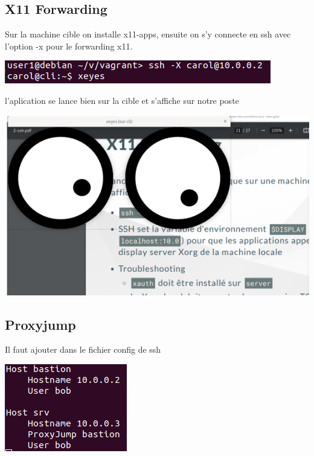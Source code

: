 \documentclass{article}
\begin{document}
 \subsection{\large{X11 Forwarding}}
 
 Sur la machine cible on installe x11-apps, ensuite on s'y connecte en ssh avec l'option -x pour le forwarding x11.
 
  \begin{center}
        \includegraphics[scale=0.5]{Images/x11.png}
 \end{center}
 
 l'aplication se lance bien sur la cible et s'affiche sur notre poste
 
  \begin{center}
        \includegraphics[scale=0.5]{Images/x11result.png}
 \end{center}
 
  
  
  \subsection{\large{Proxyjump}}
  
  Il faut ajouter dans le fichier config de ssh
  
  \begin{center}
        \includegraphics[scale=0.5]{Images/proxyjump.png}
 \end{center}
 
\end{document}
